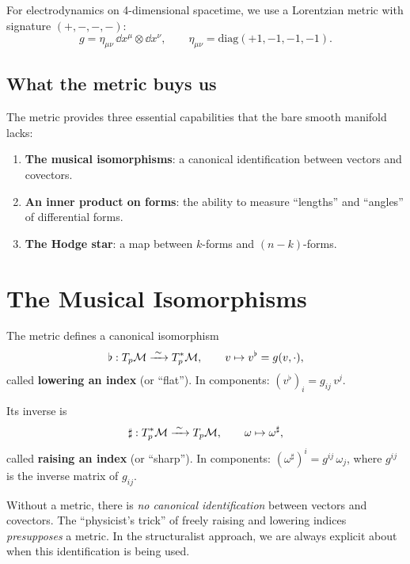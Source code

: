 For electrodynamics on 4-dimensional spacetime, we use a Lorentzian metric with signature $(+, -, -, -)$:
\begin{equation}
g = \eta_{\mu\nu}\,\dd x^\mu \otimes \dd x^\nu, \qquad \eta_{\mu\nu} = \mathrm{diag}(+1, -1, -1, -1).
\end{equation}

\subsection*{What the metric buys us}

The metric provides three essential capabilities that the bare smooth manifold lacks:

\begin{enumerate}
\item \textbf{The musical isomorphisms}: a canonical identification between vectors and covectors.
\item \textbf{An inner product on forms}: the ability to measure ``lengths'' and ``angles'' of differential forms.
\item \textbf{The Hodge star}: a map between $k$-forms and $(n{-}k)$-forms.
\end{enumerate}

\section{The Musical Isomorphisms}

\begin{definition}
The metric defines a canonical isomorphism
\begin{equation}
\flat: T_p\mathcal{M} \xrightarrow{\;\sim\;} T_p^*\mathcal{M}, \qquad v \mapsto v^\flat = g(v, \cdot),
\end{equation}
called \textbf{lowering an index} (or ``flat''). In components: $(v^\flat)_i = g_{ij}\,v^j$.

Its inverse is
\begin{equation}
\sharp: T_p^*\mathcal{M} \xrightarrow{\;\sim\;} T_p\mathcal{M}, \qquad \omega \mapsto \omega^\sharp,
\end{equation}
called \textbf{raising an index} (or ``sharp''). In components: $(\omega^\sharp)^i = g^{ij}\,\omega_j$, where $g^{ij}$ is the inverse matrix of $g_{ij}$.
\end{definition}

\begin{warning}
Without a metric, there is \emph{no canonical identification} between vectors and covectors. The ``physicist's trick'' of freely raising and lowering indices \emph{presupposes} a metric. In the structuralist approach, we are always explicit about when this identification is being used.
\end{warning}

